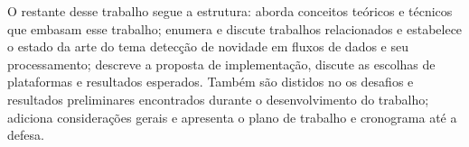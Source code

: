 

O restante desse trabalho segue a estrutura:
 aborda conceitos teóricos e técnicos que embasam
esse trabalho;
 enumera e discute trabalhos relacionados e estabelece
o estado da arte do tema detecção de novidade em fluxos de dados e seu processamento;
 descreve a proposta de implementação, discute
as escolhas de plataformas e resultados esperados.
Também são distidos no  os desafios e resultados preliminares encontrados
durante o desenvolvimento do trabalho;
 adiciona considerações gerais e apresenta o plano de trabalho
e cronograma até a defesa.
